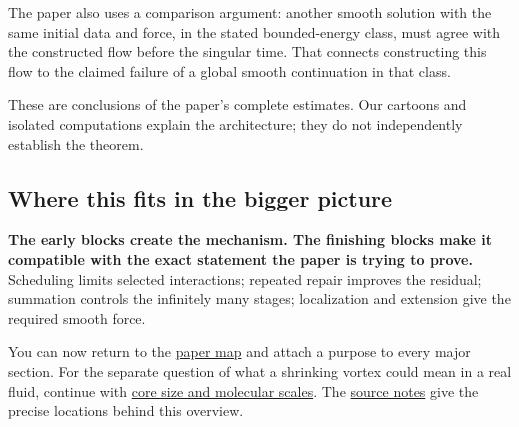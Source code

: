 \documentclass[
  english,
  11pt,
]{article}
\begin{document}
The paper also uses a comparison argument: another smooth solution with
the same initial data and force, in the stated bounded-energy class,
must agree with the constructed flow before the singular time. That
connects constructing this flow to the claimed failure of a global
smooth continuation in that class.

These are conclusions of the paper's complete estimates. Our cartoons
and isolated computations explain the architecture; they do not
independently establish the theorem.

\subsection{Where this fits in the bigger
picture}\label{where-this-fits-in-the-bigger-picture}

\textbf{The early blocks create the mechanism. The finishing blocks make
it compatible with the exact statement the paper is trying to prove.}
Scheduling limits selected interactions; repeated repair improves the
residual; summation controls the infinitely many stages; localization
and extension give the required smooth force.

You can now return to the \href{../paper-map/article.html}{paper map}
and attach a purpose to every major section. For the separate question
of what a shrinking vortex could mean in a real fluid, continue with
\href{../d1_core_size/article.html}{core size and molecular scales}. The
\href{source-notes.md}{source notes} give the precise locations behind
this overview.
\end{document}
